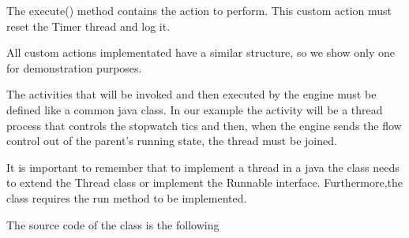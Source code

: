 \documentclass[]{article}
\begin{document}
The execute() method contains the action to perform. This custom action must reset the Timer thread and log it.

All custom actions implementated have a similar structure, so we show only one for demonstration purposes. 

The activities that will be invoked and then executed by the engine must be defined like a common java class. In our example the activity will be a thread process that controls the stopwatch tics and then, when the engine sends the flow control out of the parent's running state, the thread must be joined.

It is important to remember that to implement a thread in a java the class needs to extend the Thread class or implement the Runnable interface. Furthermore,the class requires the run method to be implemented.

The source code of the class is the following 
\end{document}
